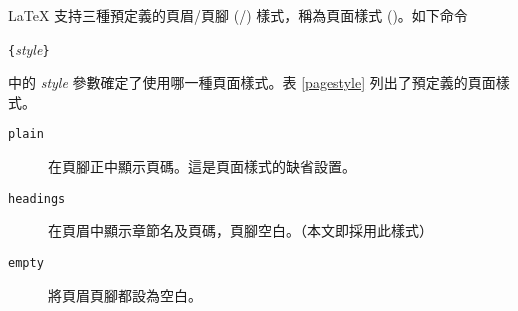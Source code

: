  

\LaTeX{} 支持三種預定義的頁眉/頁腳 (/) 樣式，稱為頁面樣式 ()。如下命令
\begin{lscommand}
\verb|{|\emph{style}\verb|}|
\end{lscommand}
\noindent%
中的 \emph{style} 參數確定了使用哪一種頁面樣式。表 \ref{pagestyle} 列出了預定義的頁面樣式。

%
%
%
\begin{table}[!hbp]
\caption{\LaTeX 預定義的頁面樣式。} \label{pagestyle}
\begin{lined}{\textwidth}
\begin{description}

\item[\normalfont\texttt{plain}] 在頁腳正中顯示頁碼。這是頁面樣式的缺省設置。

\item[\normalfont\texttt{headings}]
在頁眉中顯示章節名及頁碼，頁腳空白。（本文即採用此樣式）
\item[\normalfont\texttt{empty}] 將頁眉頁腳都設為空白。

\end{description}
\end{lined}
\end{table}

